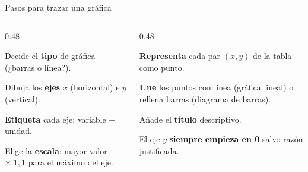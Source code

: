 \documentclass[aspectratio=169, 10pt, spanish]{beamer}
\begin{document}
\begin{frame}{Pasos para trazar una gráfica}
  \begin{columns}[T]
    \begin{column}{0.48\textwidth}
      \begin{pasobox}[1]
        \AlmFontSmall Decide el \textbf{tipo} de gráfica
        (¿barras o línea?).
      \end{pasobox}\vspace{3pt}
      \begin{pasobox}[2]
        \AlmFontSmall Dibuja los \textbf{ejes} $x$ (horizontal) e $y$ (vertical).
      \end{pasobox}\vspace{3pt}
      \begin{pasobox}[3]
        \AlmFontSmall \textbf{Etiqueta} cada eje: variable + unidad.
      \end{pasobox}\vspace{3pt}
      \begin{pasobox}[4]
        \AlmFontSmall Elige la \textbf{escala}: mayor valor $\times\;1{,}1$
        para el máximo del eje.
      \end{pasobox}
    \end{column}
    \begin{column}{0.48\textwidth}
      \begin{pasobox}[5]
        \AlmFontSmall \textbf{Representa} cada par $(x,y)$
        de la tabla como punto.
      \end{pasobox}\vspace{3pt}
      \begin{pasobox}[6]
        \AlmFontSmall \textbf{Une} los puntos con línea (gráfica lineal)
        o rellena barras (diagrama de barras).
      \end{pasobox}\vspace{3pt}
      \begin{pasobox}[7]
        \AlmFontSmall Añade el \textbf{título} descriptivo.
      \end{pasobox}

      \vspace{0.15cm}
      \begin{notabox}
        \AlmFontSmall
        El eje $y$ \textbf{siempre empieza en 0}
        salvo razón justificada.
      \end{notabox}
    \end{column}
  \end{columns}
\end{frame}
\end{document}
